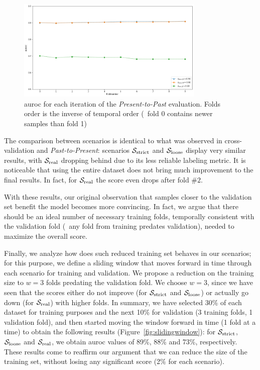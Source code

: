 \begin{figure}[!h]
	\centering
	\includegraphics[width=0.8\textwidth]{Figures/presentpast.png}
	\caption[Single layer results for static features in \textit{Present-to-Past}.]{\gls{auroc} for each iteration of the \textit{Present-to-Past} evaluation. Folds order is the inverse of temporal order (\ie\ fold 0 contains newer samples than fold 1)}
	\label{fig:presentpast}
\end{figure}

\medskip

The comparison between scenarios is identical to what was observed in cross-validation and \textit{Past-to-Present}: scenarios $\mathcal{S}_{\mathrm{strict}}$ and $\mathcal{S}_{\mathrm{loose}}$ display very similar results, with $\mathcal{S}_{\mathrm{real}}$ dropping behind due to its less reliable labeling metric.
It is noticeable that using the entire dataset does not bring much improvement to the final results. In fact, for $\mathcal{S}_{\mathrm{real}}$ the score even drops after fold $\#2$.

With these results, our original observation that samples closer to the validation set benefit the model becomes more convincing. In fact, we argue that there should be an ideal number of necessary training folds, temporally consistent with the validation fold (\ie\ any fold from training predates validation), needed to maximize the overall score.

\medskip

Finally, we analyze how does such reduced training set behaves in our scenarios; for this purpose, we define a sliding window that moves forward in time through each scenario for training and validation.
We propose a reduction on the training size to $w=3$ folds predating the validation fold. We choose $w=3$, since we have seen that the scores either do not improve (for $\mathcal{S}_{\mathrm{strict}}$ and $\mathcal{S}_{\mathrm{loose}}$) or actually go down (for $\mathcal{S}_{\mathrm{real}}$) with higher folds.
In summary, we have selected 30\% of each dataset for training purposes and the next 10\% for validation (3 training folds, 1 validation fold), and then started moving the window forward in time (1 fold at a time) to obtain the following results (Figure~\ref{fig:slidingwindow}): for  $\mathcal{S}_{\mathrm{strict}}$, $\mathcal{S}_{\mathrm{loose}}$ and $\mathcal{S}_{\mathrm{real}}$, we obtain \gls{auroc} values of 89\%, 88\% and 73\%, respectively. 
These results come to reaffirm our argument that we can reduce the size of the training set, without losing any significant score (2\% for each scenario).

